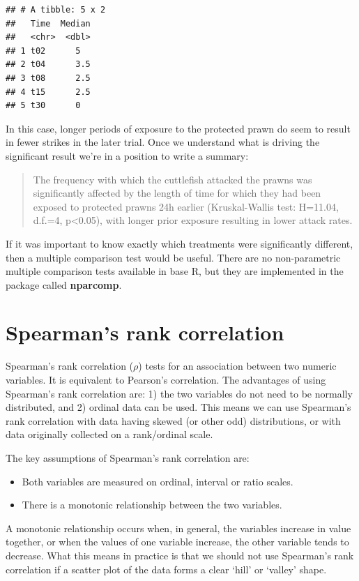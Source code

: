 \documentclass[
]{book}
\begin{document}
\begin{verbatim}
## # A tibble: 5 x 2
##   Time  Median
##   <chr>  <dbl>
## 1 t02      5  
## 2 t04      3.5
## 3 t08      2.5
## 4 t15      2.5
## 5 t30      0
\end{verbatim}

In this case, longer periods of exposure to the protected prawn do seem to result in fewer strikes in the later trial. Once we understand what is driving the significant result we're in a position to write a summary:

\begin{quote}
The frequency with which the cuttlefish attacked the prawns was significantly affected by the length of time for which they had been exposed to protected prawns 24h earlier (Kruskal-Wallis test: H=11.04, d.f.=4, p\textless0.05), with longer prior exposure resulting in lower attack rates.
\end{quote}

If it was important to know exactly which treatments were significantly different, then a multiple comparison test would be useful. There are no non-parametric multiple comparison tests available in base R, but they are implemented in the package called \textbf{nparcomp}.

\hypertarget{spearmans-rank-correlation}{%
\section{Spearman's rank correlation}\label{spearmans-rank-correlation}}

Spearman's rank correlation (\(\rho\)) tests for an association between two numeric variables. It is equivalent to Pearson's correlation. The advantages of using Spearman's rank correlation are: 1) the two variables do not need to be normally distributed, and 2) ordinal data can be used. This means we can use Spearman's rank correlation with data having skewed (or other odd) distributions, or with data originally collected on a rank/ordinal scale.

The key assumptions of Spearman's rank correlation are:

\begin{itemize}
\item
  Both variables are measured on ordinal, interval or ratio scales.
\item
  There is a monotonic relationship between the two variables.
\end{itemize}

A monotonic relationship occurs when, in general, the variables increase in value together, or when the values of one variable increase, the other variable tends to decrease. What this means in practice is that we should not use Spearman's rank correlation if a scatter plot of the data forms a clear `hill' or `valley' shape.
\end{document}
